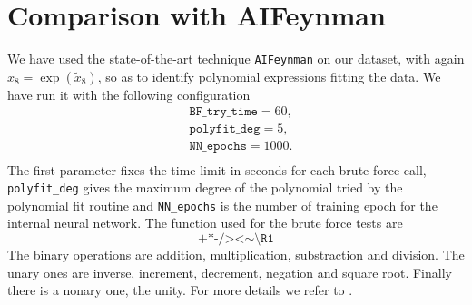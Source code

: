 \documentclass[11pt,a4paper]{article}
\newcommand{\ce}[1]{\marginpar{\parbox{\marginparwidth}{\boldmath $\Longleftarrow$}}{\boldmath\bfseries (ce: #1)}}
\begin{document}
\section{Comparison with AIFeynman} \ce{Appendix?}
We have used the state-of-the-art technique \texttt{AIFeynman} \cite{} on our dataset, with again $x_8 = \exp(\tilde{x}_8)$, so as to identify polynomial expressions fitting the data. We have run it with the following configuration 
\begin{equation}
	\begin{aligned}
		&\texttt{BF\_try\_time} = 60, \\
		&\texttt{polyfit\_deg} = 5, \\
		&\texttt{NN\_epochs} = 1000.\\
	\end{aligned}
\end{equation}
The first parameter fixes the time limit in seconds for each brute force call, \texttt{polyfit\_deg} gives the maximum degree of the polynomial tried by the polynomial fit routine and \texttt{NN\_epochs} is the number of training epoch for the internal neural network. The function used for the brute force tests are 
\begin{equation}
\texttt{+*-/><} \sim \texttt{\textbackslash R1}
\end{equation}
The binary operations are addition, multiplication, substraction and division. The unary ones are inverse, increment, decrement, negation and square root. Finally there is a nonary one, the unity. For more details we refer to \cite{Udrescu:2019mnk}.
\end{document}
